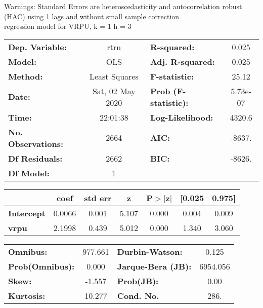 Warnings: \newline
 [1] Standard Errors are heteroscedasticity and autocorrelation robust (HAC) using 1 lags and without small sample correction\\ 

regression model for VRPU, k = 1 h = 3\begin{center}
\begin{tabular}{lclc}
\toprule
\textbf{Dep. Variable:}    &       rtrn       & \textbf{  R-squared:         } &     0.025   \\
\textbf{Model:}            &       OLS        & \textbf{  Adj. R-squared:    } &     0.025   \\
\textbf{Method:}           &  Least Squares   & \textbf{  F-statistic:       } &     25.12   \\
\textbf{Date:}             & Sat, 02 May 2020 & \textbf{  Prob (F-statistic):} &  5.73e-07   \\
\textbf{Time:}             &     22:01:38     & \textbf{  Log-Likelihood:    } &    4320.6   \\
\textbf{No. Observations:} &        2664      & \textbf{  AIC:               } &    -8637.   \\
\textbf{Df Residuals:}     &        2662      & \textbf{  BIC:               } &    -8626.   \\
\textbf{Df Model:}         &           1      & \textbf{                     } &             \\
\bottomrule
\end{tabular}
\begin{tabular}{lcccccc}
                   & \textbf{coef} & \textbf{std err} & \textbf{z} & \textbf{P$> |$z$|$} & \textbf{[0.025} & \textbf{0.975]}  \\
\midrule
\textbf{Intercept} &       0.0066  &        0.001     &     5.107  &         0.000        &        0.004    &        0.009     \\
\textbf{vrpu}      &       2.1998  &        0.439     &     5.012  &         0.000        &        1.340    &        3.060     \\
\bottomrule
\end{tabular}
\begin{tabular}{lclc}
\textbf{Omnibus:}       & 977.661 & \textbf{  Durbin-Watson:     } &    0.125  \\
\textbf{Prob(Omnibus):} &   0.000 & \textbf{  Jarque-Bera (JB):  } & 6954.056  \\
\textbf{Skew:}          &  -1.557 & \textbf{  Prob(JB):          } &     0.00  \\
\textbf{Kurtosis:}      &  10.277 & \textbf{  Cond. No.          } &     286.  \\
\bottomrule
\end{tabular}
\end{center}

